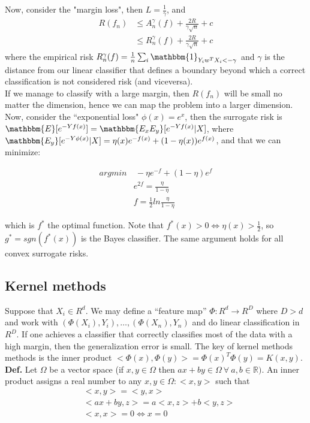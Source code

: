 \documentclass[11pt, english]{article}
\begin{document}
Now, consider the "margin loss", then $L = \frac{1}{\gamma}$, and
\begin{align*}
	 R(f_n) &\leq A_n^{\gamma}(f) + \frac{2R}{\gamma\sqrt{n}} + c\\
	 &\leq R_n^{\gamma}(f) + \frac{2R}{\gamma\sqrt{n}} + c
\end{align*}
where the empirical risk $R_n^{\gamma}(f) = \frac{1}{n} \sum_i \mathbbm{1}_{Y_iw^TX_i < -\gamma}$ and $\gamma$ is the distance from our linear classifier that defines a boundary beyond which a correct classification is not considered risk (and viceversa).\\ 
If we manage to classify with a large margin, then $R(f_n)$ will be small no matter the dimension, hence we can map the problem into a larger dimension.\\
 
Now, consider the ``exponential loss" $\phi(x) = e^x$, then the surrogate risk is $\mathbbm{E}[e^{-Yf(x)}] = \mathbbm{E_xE_y}[e^{-Yf(x)}|X]$, where $\mathbbm{E_y}[e^{-Y\phi(x)}|X] = \eta(x) e^{-f(x)} + (1-\eta(x))e^{f(x)}$, and that we can minimize: 
 
\begin{align}
	 arg min &\ -\eta e^{-f} + (1-\eta)e^f\\
	 & e^{2f} = \frac{\eta}{1 - \eta}\\
	 & f = \frac{1}{2} ln \frac{\eta}{1 - \eta}
\end{align}

which is $f^*$ the optimal function. Note that $f^*(x)>0 \Leftrightarrow \eta(x)>\frac{1}{2}$, so $g^* = sgn(f^*(x))$ is the Bayes classifier. The same argument holds for all convex surrogate risks.
 

\subsection{Kernel methods}


Suppose that $X_i \in R^d$. We may define a ``feature map'' $\Phi : R^d \rightarrow R^D$ where $ D>d$ and work with $(\Phi(X_i), Y_i), \dots, (\Phi(X_n), Y_n)$ and do linear classification in $R^D$. If one achieves a classifier that correctly classifies most of the data with a high margin, then the generalization error is small. The key of kernel methods methods is the inner product $<\Phi(x), \Phi(y)> = \Phi(x)^T \Phi(y) = K(x,y)$.\\

\textbf{Def.} Let $\Omega$ be a vector space (if $x, y \in \Omega$ then $ax + by \in \Omega \ \forall \ a,b \in \mathbb{R})$. An inner product assigns a real number to any $x,y \in \Omega: <x,y>$ such that
\begin{align}
	&<x,y> = <y,x>\\
	&<ax + by, z> = a<x,z> + b<y, z>\\
	&<x,x> = 0 \Leftrightarrow x = 0
\end{align}
\end{document}
